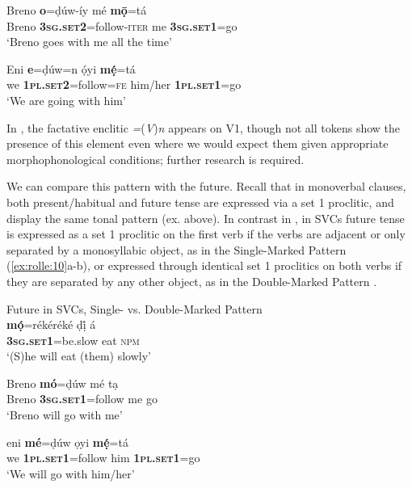 \documentclass[output=paper]{langsci/langscibook}
\begin{document}
\ea
\gll   Breno   \textbf{o}=ḍúw-íy         mé   \textbf{mọ̄}=tá\\ 
       Breno   \textbf{\textsc{3sg.set2}}=follow-\textsc{iter}  me   \textbf{3}\textbf{\textsc{sg.set1}}\textsc{=}go\\
\glt ‘Breno goes with me all the time’
\z




\ea
\gll   Eni   \textbf{e}=ḍúw=n       ọ́yi       \textbf{mẹ́}=tá\\ 
       we   \textbf{\textsc{1pl.set2}}=follow=\textsc{fe}   him/her    \textbf{\textsc{1pl.set1}}=go\\
\glt ‘We are going with him’
\z

In , the factative enclitic \textit{=}(\textit{V})\textit{n} appears on V1, though not all tokens show the presence of this element even where we would expect them given appropriate morphophonological conditions; further research is required. 

We can compare this pattern with the future. Recall that in monoverbal clauses, both present/habitual and future tense are expressed via a set 1 proclitic, and display the same tonal pattern (ex.  above). In contrast in , in SVCs future tense is expressed as a set 1 proclitic on the first verb if the verbs are adjacent or only separated by a monosyllabic object, as in the Single-Marked Pattern (\ref{ex:rolle:10}a-b), or expressed through identical set 1 proclitics on both verbs if they are separated by any other object, as in the Double-Marked Pattern . 

\label{bkm:Ref453836224}


\ea
{Future in SVCs, Single- vs. Double-Marked Pattern}\\
\gll   \textbf{mọ́}=rékéréké     ḍị́   á\\ 
       \textbf{\textsc{3sg.set1}}=be.slow   eat   \textsc{npm}\\
\glt ‘(S)he will eat (them) slowly’ 
\z

\ea
\gll   Breno  \textbf{mó}=ḍúw       mé   tạ\\ 
       Breno   \textbf{\textsc{3sg.set1}}=follow    me  go\\
\glt ‘Breno will go with me’
\z

\ea
\gll   eni   \textbf{mé}=ḍúw     ọyi    \textbf{mẹ́}=tá\\ 
       we   \textbf{\textsc{1pl.set1}}=follow  him    \textbf{\textsc{1pl.set1}}=go\\
\glt ‘We will go with him/her’
\z
\end{document}

